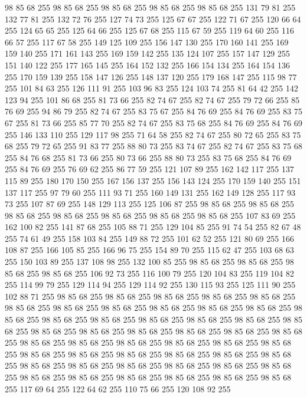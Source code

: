 98 85 68 255 98 85 68 255 98 85 68 255 98 85 68 255 98 85 68 255 131 79 81 255 132 77 81 255 132 72 76 255 127 74 73 255 125 67 67 255 122 71 67 255 120 66 64 255 124 65 65 255 125 64 66 255 125 67 68 255 115 67 59 255 119 64 60 255 116 66 57 255 117 67 58 255 149 125 109 255 156 147 130 255 170 160 141 255 169 159 140 255 171 161 143 255 169 159 142 255 135 124 107 255 157 147 129 255 151 140 122 255 177 165 145 255 164 152 132 255 166 154 134 255 164 154 136 255 170 159 139 255 158 147 126 255 148 137 120 255 179 168 147 255 115 98 77 255 101 84 63 255 126 111 91 255 103 96 83 255 124 103 74 255 81 64 42 255 142 123 94 255 101 86 68 255 81 73 66 255 82 74 67 255 82 74 67 255 79 72 66 255 85 76 69 255 94 86 79 255 82 74 67 255 83 75 67 255 84 76 69 255 84 76 69 255 83 75 67 255 81 73 66 255 85 77 70 255 82 74 67 255 83 75 68 255 84 76 69 255 84 76 69 255 146 133 110 255 129 117 98 255 71 64 58 255
82 74 67 255 80 72 65 255 83 75 68 255 79 72 65 255 91 83 77 255 88 80 73 255 83 74 67 255 82 74 67 255 83 75 68 255 84 76 68 255 81 73 66 255 80 73 66 255 88 80 73 255 83 75 68 255 84 76 69 255 84 76 69 255 76 69 62 255 86 77 59 255 121 107 89 255 162 142 117 255 137 115 89 255 180 170 150 255 167 156 137 255 156 143 124 255 170 159 140 255 151 137 117 255 97 79 60 255 111 93 71 255 160 149 131 255 162 149 128 255 117 93 73 255 107 87 69 255 148 129 113 255 125 106 87 255 98 85 68 255 98 85 68 255 98 85 68 255 98 85 68 255 98 85 68 255 98 85 68 255 98 85 68 255 107 83 69 255 162 100 82 255 141 87 68 255 105 88 71 255 129 104 85 255 91 74 54 255 82 67 48 255 74 61 49 255 158 103 84 255 149 88 72 255 101 62 52 255 121 80 69 255 166 108 87 255 166 105 85 255 166 96 75 255 154 89 70 255 115 62 47 255 103 68 63 255 150 103 89 255 137 108 98 255 132 100 85 255 98 85 68 255 98 85 68 255
98 85 68 255 98 85 68 255 106 92 73 255 116 100 79 255 120 104 83 255 119 104 82 255 114 99 79 255 129 114 94 255 129 114 92 255 130 115 93 255 125 111 90 255 102 88 71 255 98 85 68 255 98 85 68 255 98 85 68 255 98 85 68 255 98 85 68 255 98 85 68 255 98 85 68 255 98 85 68 255 98 85 68 255 98 85 68 255 98 85 68 255 98 85 68 255 98 85 68 255 98 85 68 255 98 85 68 255 98 85 68 255 98 85 68 255 98 85 68 255 98 85 68 255 98 85 68 255 98 85 68 255 98 85 68 255 98 85 68 255 98 85 68 255 98 85 68 255 98 85 68 255 98 85 68 255 98 85 68 255 98 85 68 255 98 85 68 255 98 85 68 255 98 85 68 255 98 85 68 255 98 85 68 255 98 85 68 255 98 85 68 255 98 85 68 255 98 85 68 255 98 85 68 255 98 85 68 255 98 85 68 255 98 85 68 255 98 85 68 255 98 85 68 255 98 85 68 255 98 85 68 255 98 85 68 255 98 85 68 255 117 69 64 255 122 64 62 255 110 75 66 255 120 108 92 255
